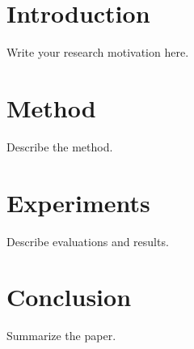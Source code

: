 \documentclass[11pt]{article}
\begin{document}
\CaseCover
\begin{abstract}
Write the abstract here.
\end{abstract}
\section{Introduction}
Write your research motivation here.
\section{Method}
Describe the method.
\section{Experiments}
Describe evaluations and results.
\section{Conclusion}
Summarize the paper.
\end{document}
